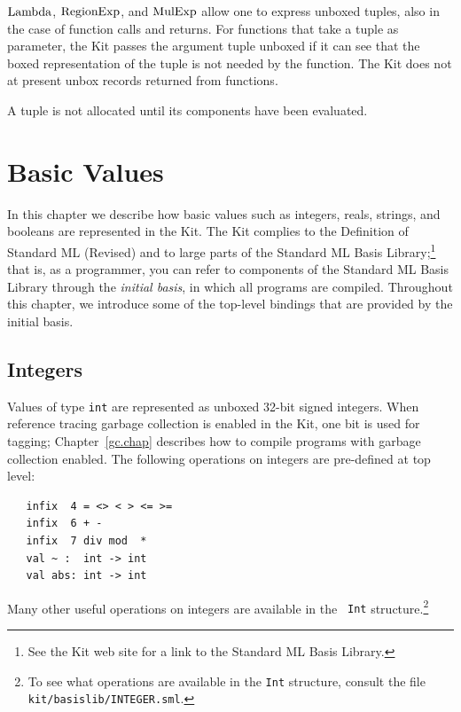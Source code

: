 \documentclass[12pt]{book}
\begin{document}
$\hbox{\rm Lambda}$, $\hbox{\rm RegionExp}$, and $\hbox{\rm MulExp}$ allow one to express unboxed tuples,
also in the case of function calls and returns. For functions that
take a tuple as parameter, the Kit passes the argument tuple unboxed
%
%
if it can see that the boxed representation of the tuple is not needed
by the function. The Kit does not at present unbox records returned
from functions.

A tuple is not allocated until its components have been evaluated.

\chapter{Basic Values}
In this chapter we describe how basic values such as integers, reals,
strings, and booleans are represented in the Kit. The Kit complies to
the Definition of Standard ML (Revised)
%
and to large parts of the Standard ML Basis
Library;\footnote{See the Kit web site for a link to the Standard ML
  Basis Library.}
%
that is, as a programmer, you can refer to components of the Standard
ML Basis Library through the
%
{\em initial basis}, in which all programs are compiled.  Throughout
this chapter, we introduce some of the top-level bindings that are
provided by the initial basis.

\section{Integers}
\label{integers.sec}
Values of type 
%
{\tt int} are represented as unboxed 32-bit signed integers. When reference
tracing garbage collection is enabled in the Kit, one bit is used for
tagging; Chapter~\ref{gc.chap} describes how to compile programs with
garbage collection enabled.  The following operations on integers are
pre-defined at top level:
%
%
%
%
%
%
%
%
%
%
%
%
%
\begin{verbatim}
   infix  4 = <> < > <= >= 
   infix  6 + - 
   infix  7 div mod  * 
   val ~ :  int -> int
   val abs: int -> int
\end{verbatim}
Many other useful operations on integers are available in the {\tt
  Int} structure.\footnote{To see what operations are available in the
  {\tt Int} structure, consult the file {\tt
    kit/basislib/INTEGER.sml}.}
\end{document}
